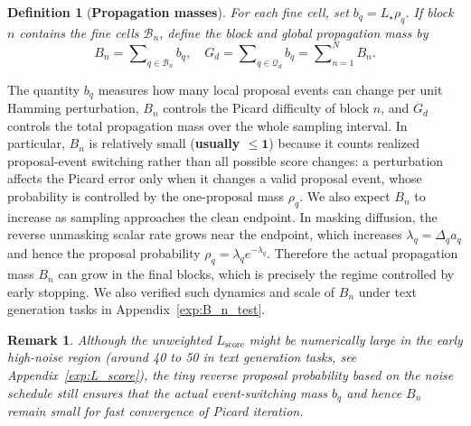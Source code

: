 \documentclass{article}
\newtheorem{definition}{Definition}[section]
\newtheorem{remark}{Remark}[section]
\begin{document}
\begin{definition}[\bf Propagation masses]
\label{def:block-masses}
For each fine cell, set $b_q=L_\star\rho_q$. If block $n$ contains the fine cells $\mathcal B_n$, define the block and global propagation mass by
\[
B_n=\sum\nolimits_{q\in\mathcal B_n}b_q, \quad G_d=\sum\nolimits_{q\in\mathcal Q_d}b_q=\sum\nolimits_{n=1}^N B_n.
\]

\end{definition}
 The quantity \(b_q\) measures how many local proposal events can change per unit Hamming perturbation, $B_n$ controls the Picard difficulty of block $n$, and $G_d$ controls the total propagation mass over the whole sampling interval. In particular, $B_n$ is relatively small (\textbf{usually $\boldsymbol{\leq 1}$}) because it counts realized proposal-event switching rather than all possible score changes: a perturbation affects the Picard error only when it changes a valid proposal event, whose probability is controlled by the one-proposal mass \(\rho_q\). We also expect \(B_n\) to increase as sampling approaches the clean endpoint. In masking diffusion, the reverse unmasking scalar rate grows near the endpoint, which increases \(\lambda_q=\Delta_q a_q\) and hence the proposal probability \(\rho_q=\lambda_q e^{-\lambda_q}\). Therefore the actual propagation mass \(B_n\) can grow in the final blocks, which is precisely the regime controlled by early stopping. We also verified such dynamics and scale of \(B_n\) under text generation tasks in Appendix~\ref{exp:B_n_test}.

\begin{remark}
Although the unweighted \(L_{\mathrm{score}}\) might be numerically large in the early high-noise region (around 40 to 50 in text generation tasks, see Appendix~\ref{exp:L_score}), the tiny reverse proposal probability based on the noise schedule still ensures that the actual event-switching mass \(b_q\) and hence \(B_n\) remain small for fast convergence of Picard iteration.
\end{remark}
\end{document}
